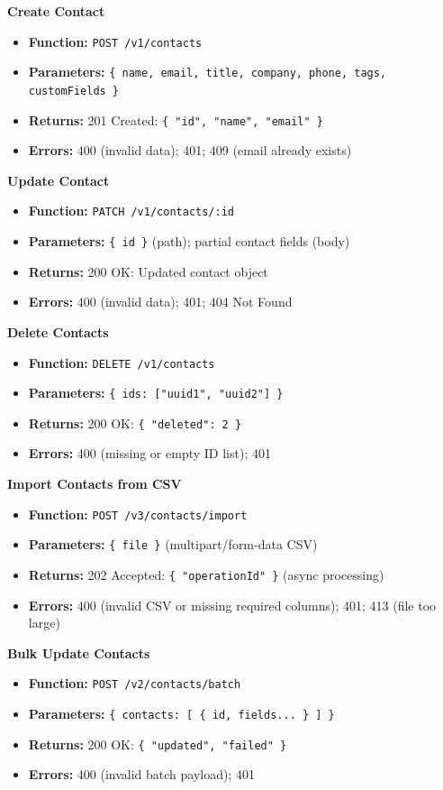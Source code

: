 \documentclass[a4paper]{article}
\begin{document}
\textbf{Create Contact}
\begin{itemize}
  \item \textbf{Function:} \texttt{POST /v1/contacts}
  \item \textbf{Parameters:} \texttt{\{ name, email, title, company, phone, tags, customFields \}}
  \item \textbf{Returns:} 201 Created: \texttt{\{ "id", "name", "email" \}}
  \item \textbf{Errors:} 400 (invalid data); 401; 409 (email already exists)
\end{itemize}

\textbf{Update Contact}
\begin{itemize}
  \item \textbf{Function:} \texttt{PATCH /v1/contacts/:id}
  \item \textbf{Parameters:} \texttt{\{ id \}} (path); partial contact fields (body)
  \item \textbf{Returns:} 200 OK: Updated contact object
  \item \textbf{Errors:} 400 (invalid data); 401; 404 Not Found
\end{itemize}

\textbf{Delete Contacts}
\begin{itemize}
  \item \textbf{Function:} \texttt{DELETE /v1/contacts}
  \item \textbf{Parameters:} \texttt{\{ ids: ["uuid1", "uuid2"] \}}
  \item \textbf{Returns:} 200 OK: \texttt{\{ "deleted": 2 \}}
  \item \textbf{Errors:} 400 (missing or empty ID list); 401
\end{itemize}

\textbf{Import Contacts from CSV}
\begin{itemize}
  \item \textbf{Function:} \texttt{POST /v3/contacts/import}
  \item \textbf{Parameters:} \texttt{\{ file \}} (multipart/form-data CSV)
  \item \textbf{Returns:} 202 Accepted: \texttt{\{ "operationId" \}} (async processing)
  \item \textbf{Errors:} 400 (invalid CSV or missing required columns); 401; 413 (file too large)
\end{itemize}

\textbf{Bulk Update Contacts}
\begin{itemize}
  \item \textbf{Function:} \texttt{POST /v2/contacts/batch}
  \item \textbf{Parameters:} \texttt{\{ contacts: [ \{ id, fields... \} ] \}}
  \item \textbf{Returns:} 200 OK: \texttt{\{ "updated", "failed" \}}
  \item \textbf{Errors:} 400 (invalid batch payload); 401
\end{itemize}
\end{document}
